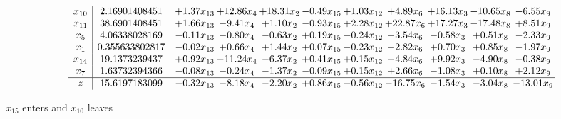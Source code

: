 \documentclass[9pt]{article}
\begin{document}
 \[\begin{array}{c| c c@{\hskip 2pt} c@{\hskip 2pt} c@{\hskip 2pt} c@{\hskip 2pt} c@{\hskip 2pt} c@{\hskip 2pt} c@{\hskip 2pt} c@{\hskip 2pt} c@{\hskip 2pt} }
 x_{10}   &  2.16901408451 & +  1.37 x_{13} & + 12.86 x_{4} & + 18.31 x_{2} & -0.49 x_{15} & +  1.03 x_{12} & +  4.89 x_{6} & + 16.13 x_{3} & -10.65 x_{8} & -6.55 x_{9}\\
 x_{11}   &  38.6901408451 & +  1.66 x_{13} & -9.41 x_{4} & +  1.10 x_{2} & -0.93 x_{15} & +  2.28 x_{12} & + 22.87 x_{6} & + 17.27 x_{3} & -17.48 x_{8} & +  8.51 x_{9}\\
 x_{5}   &  4.06338028169 & -0.11 x_{13} & -0.80 x_{4} & -0.63 x_{2} & +  0.19 x_{15} & -0.24 x_{12} & -3.54 x_{6} & -0.58 x_{3} & +  0.51 x_{8} & -2.33 x_{9}\\
 x_{1}   &  0.355633802817 & -0.02 x_{13} & +  0.66 x_{4} & +  1.44 x_{2} & +  0.07 x_{15} & -0.23 x_{12} & -2.82 x_{6} & +  0.70 x_{3} & +  0.85 x_{8} & -1.97 x_{9}\\
 x_{14}   &  19.1373239437 & +  0.92 x_{13} & -11.24 x_{4} & -6.37 x_{2} & +  0.41 x_{15} & +  0.15 x_{12} & -4.84 x_{6} & +  9.92 x_{3} & -4.90 x_{8} & -0.38 x_{9}\\
 x_{7}   &  1.63732394366 & -0.08 x_{13} & -0.24 x_{4} & -1.37 x_{2} & -0.09 x_{15} & +  0.15 x_{12} & +  2.66 x_{6} & -1.08 x_{3} & +  0.10 x_{8} & +  2.12 x_{9}\\
\hline
z    &  15.6197183099 & -0.32 x_{13} & -8.18 x_{4} & -2.20 x_{2} & +  0.86 x_{15} & -0.56 x_{12} & -16.75 x_{6} & -1.54 x_{3} & -3.04 x_{8} & -13.01 x_{9}\\
\end{array}\]


 $ x_{15} $ enters and $ x_{10} $ leaves 
\end{document}
